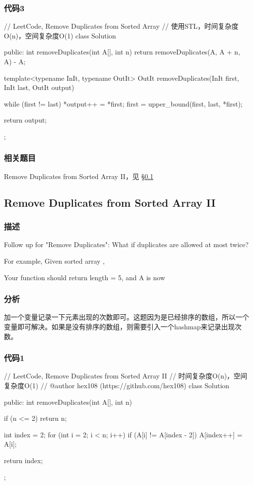 \subsubsection{代码3}
\begin{Code}
// LeetCode, Remove Duplicates from Sorted Array
// 使用STL，时间复杂度O(n)，空间复杂度O(1)
class Solution {
public:
    int removeDuplicates(int A[], int n) {
        return removeDuplicates(A, A + n, A) - A;
    }

    template<typename InIt, typename OutIt>
    OutIt removeDuplicates(InIt first, InIt last, OutIt output) {
        while (first != last) {
            *output++ = *first;
            first = upper_bound(first, last, *first);
        }

        return output;
    }
};
\end{Code}


\subsubsection{相关题目}

\begindot
\item Remove Duplicates from Sorted Array II，见 \S \ref{sec:remove-duplicates-from-sorted-array-ii}
\myenddot


\subsection{Remove Duplicates from Sorted Array II}
\label{sec:remove-duplicates-from-sorted-array-ii}


\subsubsection{描述}
Follow up for "Remove Duplicates":
What if duplicates are allowed at most twice?

For example,
Given sorted array ,

Your function should return length = 5, and A is now \code{[1,1,2,2,3]}


\subsubsection{分析}
加一个变量记录一下元素出现的次数即可。这题因为是已经排序的数组，所以一个变量即可解决。如果是没有排序的数组，则需要引入一个hashmap来记录出现次数。


\subsubsection{代码1}
\begin{Code}
// LeetCode, Remove Duplicates from Sorted Array II
// 时间复杂度O(n)，空间复杂度O(1)
// @author hex108 (https://github.com/hex108)
class Solution {
public:
    int removeDuplicates(int A[], int n) {
        if (n <= 2) return n;

        int index = 2;
        for (int i = 2; i < n; i++){
            if (A[i] != A[index - 2])
                A[index++] = A[i];
        }

        return index;
    }
};
\end{Code}


